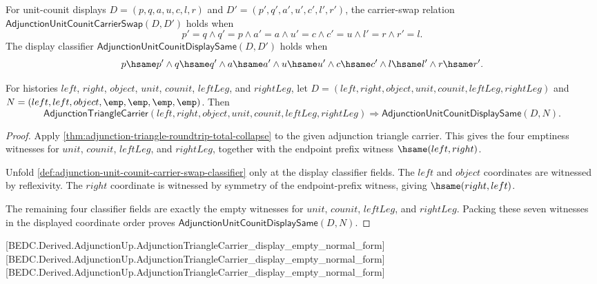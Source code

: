 \begin{definition}
\label{def:adjunction-unit-counit-carrier-swap-classifier}
For unit-counit displays $D=(p,q,a,u,c,l,r)$ and
$D'=(p',q',a',u',c',l',r')$, the carrier-swap relation
$\mathsf{AdjunctionUnitCounitCarrierSwap}(D,D')$ holds when
$$
p'=q\land q'=p\land a'=a\land u'=c\land c'=u\land l'=r\land r'=l.
$$
The display classifier $\mathsf{AdjunctionUnitCounitDisplaySame}(D,D')$ holds
when
$$
p\hsame p'\land q\hsame q'\land a\hsame a'\land u\hsame u'
\land c\hsame c'\land l\hsame l'\land r\hsame r'.
$$
\end{definition}

\begin{theorem}
\label{thm:adjunction-triangle-display-empty-normal-form}
For histories $left$, $right$, $object$, $unit$, $counit$, $leftLeg$, and
$rightLeg$, let
$D=(left,right,object,unit,counit,leftLeg,rightLeg)$ and
$N=(left,left,object,\emp,\emp,\emp,\emp)$. Then
$$
\mathsf{AdjunctionTriangleCarrier}(left,right,object,unit,counit,leftLeg,rightLeg)
\Longrightarrow
\mathsf{AdjunctionUnitCounitDisplaySame}(D,N).
$$
\end{theorem}
\begin{proof}
Apply \autoref{thm:adjunction-triangle-roundtrip-total-collapse} to the
given adjunction triangle carrier. This gives the four emptiness witnesses
for $unit$, $counit$, $leftLeg$, and $rightLeg$, together with the endpoint
prefix witness $\hsame(left,right)$.

Unfold \autoref{def:adjunction-unit-counit-carrier-swap-classifier} only at
the display classifier fields. The $left$ and $object$ coordinates are
witnessed by reflexivity. The $right$ coordinate is witnessed by symmetry of
the endpoint-prefix witness, giving $\hsame(right,left)$.

The remaining four classifier fields are exactly the empty witnesses for
$unit$, $counit$, $leftLeg$, and $rightLeg$. Packing these seven witnesses in
the displayed coordinate order proves
$\mathsf{AdjunctionUnitCounitDisplaySame}(D,N)$.
\end{proof}



[BEDC.Derived.AdjunctionUp.AdjunctionTriangleCarrier\_display\_empty\_normal\_form]
[BEDC.Derived.AdjunctionUp.AdjunctionTriangleCarrier\_display\_empty\_normal\_form]
[BEDC.Derived.AdjunctionUp.AdjunctionTriangleCarrier\_display\_empty\_normal\_form]

